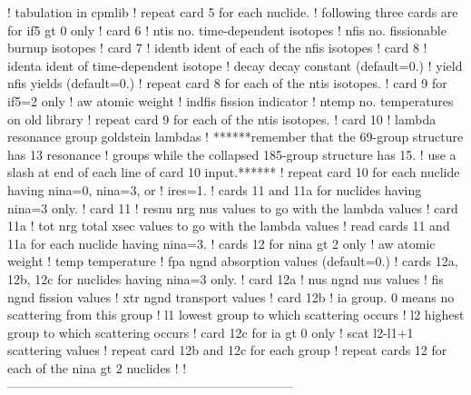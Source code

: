 \begin{ccode}
   !            tabulation in cpmlib
   !  repeat card 5 for each nuclide.
   ! following three cards are for if5 gt 0 only
   ! card 6
   !    ntis    no. time-dependent isotopes
   !    nfis    no. fissionable burnup isotopes
   ! card 7
   !    identb  ident of each of the nfis isotopes
   ! card 8
   !    identa  ident of time-dependent isotope
   !    decay   decay constant (default=0.)
   !    yield   nfis yields (default=0.)
   !  repeat card 8 for each of the ntis isotopes.
   ! card 9 for if5=2 only
   !    aw      atomic weight
   !    indfis  fission indicator
   !    ntemp   no. temperatures on old library
   !  repeat card 9 for each of the ntis isotopes.
   ! card 10
   !    lambda  resonance group goldstein lambdas
   !  ******remember that the 69-group structure has 13 resonance
   !        groups while the collapsed 185-group structure has 15.
   !        use a slash at end of each line of card 10 input.******
   !  repeat card 10 for each nuclide having nina=0, nina=3, or
   !                     ires=1.
   ! cards 11 and 11a for nuclides having nina=3 only.
   ! card 11
   !    resnu    nrg nus values to go with the lambda values
   ! card 11a
   !    tot      nrg total xsec values to go with the lambda values
   !  read cards 11 and 11a for each nuclide having nina=3.
   ! cards 12 for nina gt 2 only
   !    aw      atomic weight
   !    temp    temperature
   !    fpa     ngnd absorption values (default=0.)
   ! cards 12a, 12b, 12c for nuclides having nina=3 only.
   ! card 12a
   !    nus      ngnd nus values
   !    fis      ngnd fission values
   !    xtr      ngnd transport values
   ! card 12b
   !    ia       group.  0 means no scattering from this group
   !    l1       lowest group to which scattering occurs
   !    l2       highest group to which scattering occurs
   ! card 12c  for ia gt 0 only
   !    scat     l2-l1+1 scattering values
   !  repeat card 12b and 12c for each group
   ! repeat cards 12 for each of the nina gt 2 nuclides
   !
   !--------------------------------------------------------------------

\end{ccode}
\normalsize

\cleardoublepage

